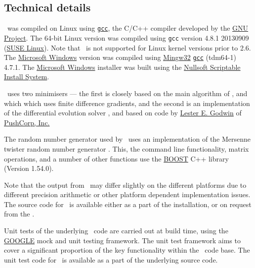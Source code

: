 \subsection{Technical details}
\CH
\CNAME\ was compiled on Linux using \href{http://gcc.gnu.org}{\texttt{gcc}}, the C/C++ compiler developed by the \href{http://gcc.gnu.org}{GNU Project}. The 64-bit Linux  version was compiled using \texttt{gcc} version 4.8.1 20130909 (\href{http://www.opensuse.org/}{SUSE Linux}). Note that \CNAME\ is not supported for Linux kernel versions prior to 2.6. The \href{http://www.microsoft.com}{Microsoft Windows} version was compiled using \href{http://www.mingw.org}{Mingw32} \href{http://gcc.gnu.org}{\texttt{gcc}} (tdm64-1) 4.7.1. The \href{http://www.microsoft.com}{Microsoft Windows} installer was built using the \href{http://nsis.sourceforge.net/Main_Page}{Nullsoft Scriptable Install System}.

\CNAME\ uses two minimisers --- the first is closely based on the main algorithm of \cite{779}, and which which uses finite difference gradients, and the second is an implementation of the differential evolution solver \citep{1442}, and based on code by \href{mailto:<godwin@pushcorp.com>}{Lester E. Godwin} of \href{http://www.pushcorp.com}{PushCorp, Inc.} 

The random number generator used by \CNAME\ uses an implementation of the Mersenne twister random number generator \citep{796}. This, the command line functionality, matrix operations, and a number of other functions use the \href{http://www.boost.org/}{BOOST} C++ library (Version 1.54.0).

Note that the output from \CNAME\ may differ slightly on the different platforms due to different precision arithmetic or other platform dependent implementation issues. The source code for \CNAME\ is available either as a part of the installation, or on request from the \authors.

Unit tests of the underlying \CNAME\ code are carried out at build time, using the \href{http://www.boost.org/}{GOOGLE} mock and unit testing framework. The unit test framework aims to cover a significant proportion of the key functionality within the \CNAME\ code base. The unit test code for \CNAME\ is available as a part of the underlying source code.

